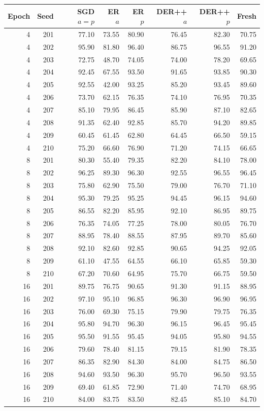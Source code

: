 \begin{tabular}{rrrrrrrr}
\toprule
Epoch & Seed & SGD $a=p$ & ER $a$ & ER $p$ & DER++ $a$ & DER++ $p$ & Fresh \\
\midrule
4 & 201 & 77.10 & 73.55 & 80.90 & 76.45 & 82.30 & 70.75 \\
4 & 202 & 95.90 & 81.80 & 96.40 & 86.75 & 96.55 & 91.20 \\
4 & 203 & 72.75 & 48.70 & 74.05 & 74.00 & 78.20 & 69.65 \\
4 & 204 & 92.45 & 67.55 & 93.50 & 91.65 & 93.85 & 90.30 \\
4 & 205 & 92.55 & 42.00 & 93.25 & 85.20 & 93.45 & 89.60 \\
4 & 206 & 73.70 & 62.15 & 76.35 & 74.10 & 76.95 & 70.35 \\
4 & 207 & 85.10 & 79.95 & 86.45 & 85.90 & 87.10 & 82.65 \\
4 & 208 & 91.35 & 62.40 & 92.85 & 85.70 & 94.20 & 89.85 \\
4 & 209 & 60.45 & 61.45 & 62.80 & 64.45 & 66.50 & 59.15 \\
4 & 210 & 75.20 & 66.60 & 76.90 & 71.20 & 74.15 & 66.65 \\
8 & 201 & 80.30 & 55.40 & 79.35 & 82.20 & 84.10 & 78.00 \\
8 & 202 & 96.25 & 89.30 & 96.30 & 92.55 & 96.55 & 96.45 \\
8 & 203 & 75.80 & 62.90 & 75.50 & 79.00 & 76.70 & 71.10 \\
8 & 204 & 95.30 & 79.25 & 95.25 & 94.45 & 96.15 & 94.60 \\
8 & 205 & 86.55 & 82.20 & 85.95 & 92.10 & 86.95 & 89.75 \\
8 & 206 & 76.35 & 74.05 & 77.25 & 78.00 & 80.05 & 76.70 \\
8 & 207 & 88.95 & 78.40 & 88.55 & 87.95 & 89.70 & 85.60 \\
8 & 208 & 92.10 & 82.60 & 92.85 & 90.65 & 94.25 & 92.05 \\
8 & 209 & 61.10 & 47.55 & 64.55 & 66.10 & 65.85 & 59.30 \\
8 & 210 & 67.20 & 70.60 & 64.95 & 75.70 & 66.75 & 59.50 \\
16 & 201 & 89.75 & 76.75 & 90.65 & 91.30 & 91.15 & 88.95 \\
16 & 202 & 97.10 & 95.10 & 96.85 & 96.30 & 96.90 & 96.95 \\
16 & 203 & 76.00 & 69.30 & 75.15 & 79.90 & 79.75 & 76.35 \\
16 & 204 & 95.80 & 94.70 & 96.30 & 96.15 & 96.45 & 95.45 \\
16 & 205 & 95.50 & 91.55 & 95.45 & 94.05 & 95.80 & 94.55 \\
16 & 206 & 79.60 & 78.40 & 81.15 & 79.15 & 81.90 & 78.35 \\
16 & 207 & 86.35 & 82.90 & 84.30 & 84.00 & 84.75 & 86.50 \\
16 & 208 & 94.60 & 93.50 & 96.30 & 95.70 & 96.50 & 93.55 \\
16 & 209 & 69.40 & 61.85 & 72.90 & 71.40 & 74.70 & 68.95 \\
16 & 210 & 84.00 & 83.75 & 83.50 & 82.45 & 85.10 & 84.70 \\
\bottomrule
\end{tabular}
